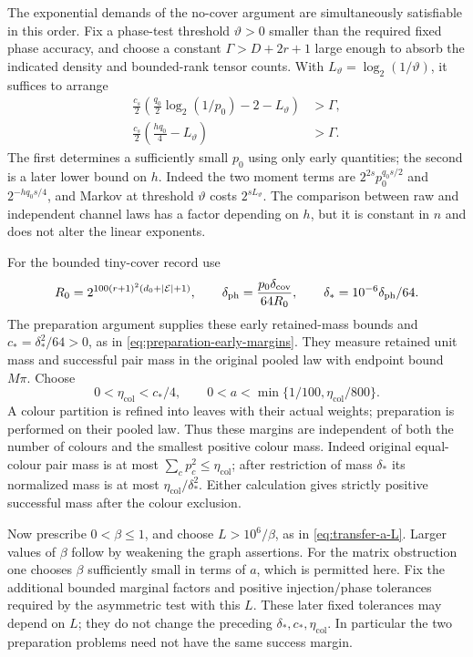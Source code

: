 The exponential demands of the no-cover argument are simultaneously
satisfiable in this order. Fix a phase-test threshold \(\vartheta>0\)
smaller than the required fixed phase accuracy, and choose a constant
\(\Gamma>D+2r+1\) large enough to absorb the indicated density and
bounded-rank tensor counts. With \(L_\vartheta=\log_2(1/\vartheta)\),
it suffices to arrange
\begin{align}
 \frac{c_s}{2}
 \left(\frac{q_0}{2}\log_2(1/p_0)-2-L_\vartheta\right)
     &>\Gamma,\label{eq:ledger-p0-demand}\\
 \frac{c_s}{2}
 \left(\frac{hq_0}{4}-L_\vartheta\right)
     &>\Gamma.\label{eq:ledger-h-moment-demand}
\end{align}
The first determines a sufficiently small \(p_0\) using only early
quantities; the second is a later lower bound on \(h\).
Indeed the two moment terms are
\(2^{2s}p_0^{q_0s/2}\) and \(2^{-hq_0s/4}\), and Markov at threshold
\(\vartheta\) costs \(2^{sL_\vartheta}\).
The comparison between raw and independent channel laws has a factor
depending on \(h\), but it is constant in \(n\) and does not alter the
linear exponents.

For the bounded tiny-cover record use
\[
 R_0=2^{100(r+1)^2(d_0+|\mathcal E|+1)},\qquad
 \delta_{\rm ph}=\frac{p_0\delta_{\mathrm{cov}}}{64R_0},\qquad
 \delta_* =10^{-6}\delta_{\rm ph}/64.
\]
The preparation argument supplies these early retained-mass bounds
and \(c_*=\delta_*^2/64>0\), as in
\eqref{eq:preparation-early-margins}.  They measure retained unit
mass and successful pair mass in the original pooled law with
endpoint bound \(M\pi\).  Choose
\begin{equation}\label{eq:ledger-colours}
 0<\eta_{\mathrm{col}}<c_*/4,\qquad
 0<a<\min\{1/100,\eta_{\mathrm{col}}/800\}.
\end{equation}
A colour partition is refined into leaves with their actual weights;
preparation is performed on their pooled law.  Thus these margins
are independent of both the number of colours and the smallest
positive colour mass.  Indeed original equal-colour pair mass is
at most \(\sum_c p_c^2\le\eta_{\mathrm{col}}\); after restriction
of mass \(\delta_*\) its normalized mass is at most
\(\eta_{\mathrm{col}}/\delta_*^2\).  Either calculation gives
strictly positive successful mass after the colour exclusion.

Now prescribe \(0<\beta\le1\), and choose \(L>10^6/\beta\), as
in \eqref{eq:transfer-a-L}.  Larger values of \(\beta\) follow
by weakening the graph assertions.  For the matrix obstruction
one chooses \(\beta\) sufficiently small in terms of \(a\),
which is permitted here.  Fix the additional bounded marginal
factors and positive injection/phase tolerances required by the
asymmetric test with this \(L\).  These later fixed tolerances
may depend on \(L\); they do not change the preceding
\(\delta_*,c_*,\eta_{\mathrm{col}}\).  In particular the two
preparation problems need not have the same success margin.

